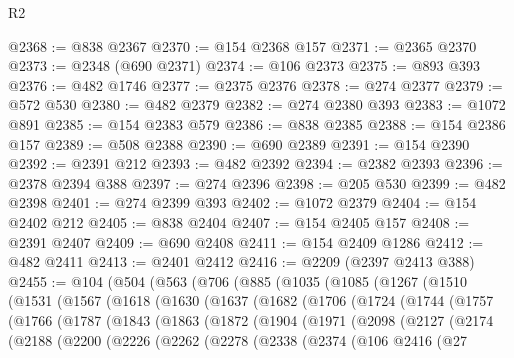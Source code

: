 \begin{lexlean}{R2}
\begin{coremodule}
@2368 := @838 @2367
@2370 := @154 @2368 @157
@2371 := @2365 @2370
@2373 := @2348 (@690 @2371)
@2374 := @106 @2373
@2375 := @893 @393
@2376 := @482 @1746
@2377 := @2375 @2376
@2378 := @274 @2377
@2379 := @572 @530
@2380 := @482 @2379
@2382 := @274 @2380 @393
@2383 := @1072 @891
@2385 := @154 @2383 @579
@2386 := @838 @2385
@2388 := @154 @2386 @157
@2389 := @508 @2388
@2390 := @690 @2389
@2391 := @154 @2390
@2392 := @2391 @212
@2393 := @482 @2392
@2394 := @2382 @2393
@2396 := @2378 @2394 @388
@2397 := @274 @2396
@2398 := @205 @530
@2399 := @482 @2398
@2401 := @274 @2399 @393
@2402 := @1072 @2379
@2404 := @154 @2402 @212
@2405 := @838 @2404
@2407 := @154 @2405 @157
@2408 := @2391 @2407
@2409 := @690 @2408
@2411 := @154 @2409 @1286
@2412 := @482 @2411
@2413 := @2401 @2412
@2416 := @2209 (@2397 @2413 @388)
@2455 := @104
    (@504
      (@563
        (@706
          (@885
            (@1035
              (@1085
                (@1267
                  (@1510
                    (@1531
                      (@1567
                        (@1618
                          (@1630
                            (@1637
                              (@1682
                                (@1706
                                  (@1724
                                    (@1744
                                      (@1757
                                        (@1766
                                          (@1787
                                            (@1843
                                              (@1863
                                                (@1872
                                                  (@1904
                                                    (@1971
                                                      (@2098
                                                        (@2127
                                                          (@2174
                                                            (@2188
                                                              (@2200
                                                                (@2226
                                                                  (@2262
                                                                    (@2278
                                                                      (@2338
                                                                        (@2374
                                                                          (@106
                                                                            @2416
                                                                            (@27

\end{coremodule}
\end{lexlean}
